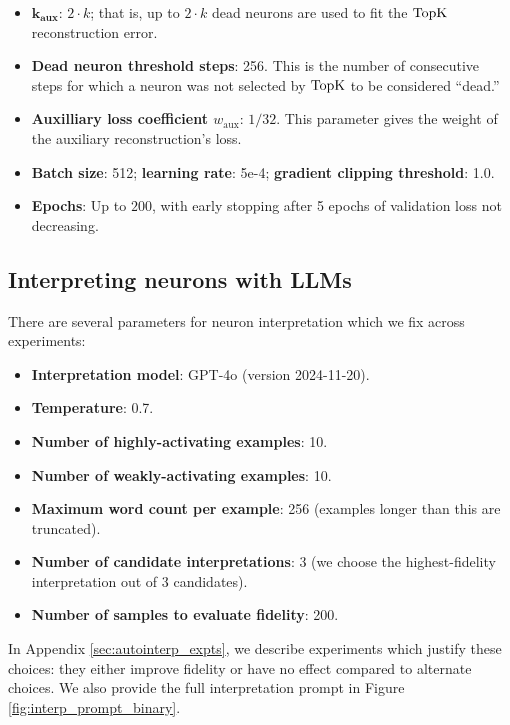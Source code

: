 \begin{itemize}
    \item $\bm{k_{\text{aux}}}$: $2\cdot k$; that is, up to $2\cdot k$ dead neurons are used to fit the $\operatorname{TopK}$ reconstruction error.
    \item \textbf{Dead neuron threshold steps}: 256. This is the number of consecutive steps for which a neuron was not selected by $\operatorname{TopK}$ to be considered ``dead.''
    \item \textbf{Auxilliary loss coefficient $w_{\text{aux}}$}: $1/32$. This parameter gives the weight of the auxiliary reconstruction's loss.
    \item \textbf{Batch size}: 512; \textbf{learning rate}: 5e-4; \textbf{gradient clipping threshold}: 1.0.
    \item \textbf{Epochs}: Up to $200$, with early stopping after 5 epochs of validation loss not decreasing.
\end{itemize}

\subsection{Interpreting neurons with LLMs}
\label{sec:hyperparams_neuronlabeling}

There are several parameters for neuron interpretation which we fix across experiments:
\begin{itemize}
    \item \textbf{Interpretation model}: GPT-4o (version 2024-11-20).
    \item \textbf{Temperature}: 0.7.
    \item \textbf{Number of highly-activating examples}: 10.
    \item \textbf{Number of weakly-activating examples}: 10.
    \item \textbf{Maximum word count per example}: 256 (examples longer than this are truncated).
    \item \textbf{Number of candidate interpretations}: 3 (we choose the highest-fidelity interpretation out of 3 candidates).
    \item \textbf{Number of samples to evaluate fidelity}: 200.
\end{itemize}

In Appendix \ref{sec:autointerp_expts}, we describe experiments which justify these choices: they either improve fidelity or have no effect compared to alternate choices. 
We also provide the full interpretation prompt in Figure \ref{fig:interp_prompt_binary}.

